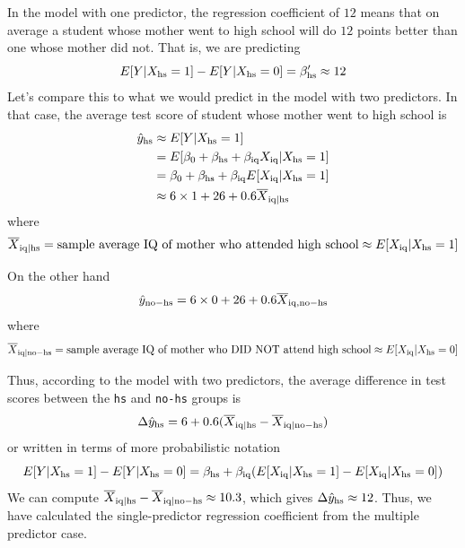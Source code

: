 \begin{itemize}
\begin{example}
In the model with one predictor, the regression coefficient of $12$ means that on average a student whose mother went to high school will do $12$ points better than one whose mother did not.  That is, we are predicting
\begin{equation*}
E[Y|X_{\rm hs} = 1]-E[Y|X_{\rm hs} = 0]  = \beta_{\rm hs}' \approx 12
\end{equation*}
Let's compare this to what we would predict in the model with two predictors. 
In that case, the average test score of student whose mother went to high school is
\begin{align*}
\hat{y}_{\rm hs} &\approx E[Y|X_{\rm hs} =1]\\
&=  E[\beta_0 +  \beta_{\rm hs} +\beta_{\rm iq}X_{\rm iq} |X_{\rm hs}=1]\\
&=\beta_0 +  \beta_{\rm hs} +\beta_{\rm iq}E[X_{\rm iq}|X_{\rm hs}=1]\\
&\approx  6\times 1+ 26  +  0.6 \overline{X}_{{\rm iq}|{\rm hs}} 
\end{align*}
where 
\begin{equation*}
\overline{X}_{{\rm iq}|{\rm hs}}  =  \text{sample average IQ of mother who attended high school} \approx E[X_{\rm iq}|X_{\rm hs}=1]
\end{equation*}

On the other hand 
\begin{equation*}
\hat{y}_{\rm no-hs} =  6 \times 0 + 26  +  0.6 \overline{X}_{{\rm iq},{\rm no-hs}} 
\end{equation*}
where 
\begin{equation*}
\overline{X}_{{\rm iq}|{\rm no-hs}}  = \text{sample average IQ of mother who DID NOT attend high school} \approx  E[X_{\rm iq}|X_{\rm hs}=0]
\end{equation*}


Thus, according to the model with two predictors, the average difference in test scores between the \verb!hs! and \verb!no-hs! groups is 
\begin{equation*}
\Delta \hat{y}_{\rm hs} = 6 +0.6(\overline{X}_{{\rm iq}|{\rm hs}}-\overline{X}_{{\rm iq}|{\rm no-hs}} )
\end{equation*}
or written in terms of more probabilistic notation 
\begin{equation*}
E[Y|X_{\rm hs} = 1]-E[Y|X_{\rm hs} = 0]  = \beta_{\rm hs} + \beta_{\rm iq}(E[X_{\rm iq}|X_{\rm hs} = 1]-E[X_{\rm iq}|X_{\rm hs} = 0]  )
\end{equation*}
We can compute $\overline{X}_{{\rm iq}|{\rm hs}}-\overline{X}_{{\rm iq}|{\rm no-hs}} \approx 10.3$, which gives $\Delta \hat{y}_{\rm hs} \approx 12$. Thus, we have calculated the single-predictor regression coefficient from the multiple predictor case.  






\end{example}
\end{itemize}
